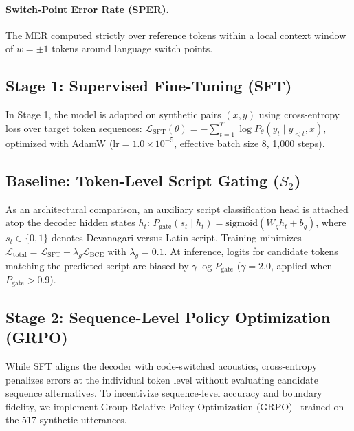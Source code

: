 \documentclass[10pt,twocolumn,a4paper]{article}
\newcommand{\sys}[1]{$S_{#1}$}
\begin{document}
\paragraph{Switch-Point Error Rate (SPER).}
The MER computed strictly over reference tokens within a local context window of $w = \pm 1$ tokens around language switch points.

\subsection{Stage 1: Supervised Fine-Tuning (SFT)}
In Stage 1, the model is adapted on synthetic pairs $(x, y)$ using cross-entropy loss over target token sequences: $\mathcal{L}_{\text{SFT}}(\theta) = -\sum_{t=1}^{T} \log P_\theta(y_t \mid y_{<t}, x)$, optimized with AdamW ($\text{lr} = 1.0 \times 10^{-5}$, effective batch size 8, 1,000 steps).

\subsection{Baseline: Token-Level Script Gating (\texorpdfstring{\sys{2}}{S2})}
As an architectural comparison, an auxiliary script classification head is attached atop the decoder hidden states $h_t$: $P_{\text{gate}}(s_t \mid h_t) = \text{sigmoid}(W_g h_t + b_g)$, where $s_t \in \{0, 1\}$ denotes Devanagari versus Latin script. Training minimizes $\mathcal{L}_{\text{total}} = \mathcal{L}_{\text{SFT}} + \lambda_g \mathcal{L}_{\text{BCE}}$ with $\lambda_g = 0.1$. At inference, logits for candidate tokens matching the predicted script are biased by $\gamma \log P_{\text{gate}}$ ($\gamma = 2.0$, applied when $P_{\text{gate}} > 0.9$).

\subsection{Stage 2: Sequence-Level Policy Optimization (GRPO)}
While SFT aligns the decoder with code-switched acoustics, cross-entropy penalizes errors at the individual token level without evaluating candidate sequence alternatives. To incentivize sequence-level accuracy and boundary fidelity, we implement Group Relative Policy Optimization (GRPO)~\cite{shao2024deepseekmath,amazon_grpo2025} trained on the 517 synthetic utterances.
\end{document}
